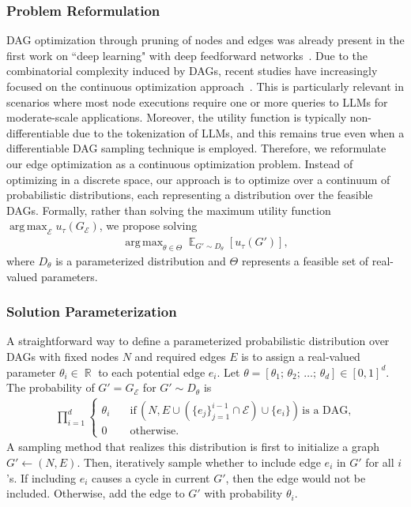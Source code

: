 \documentclass{article}
\DeclareMathOperator*{\argmax}{arg\,max}
\DeclareMathOperator{\R}{\mathbb{R}}
\DeclareMathOperator{\E}{\mathbb{E}}
\theoremstyle{plain}
\theoremstyle{definition}
\theoremstyle{remark}
\begin{document}
\subsubsection{Problem Reformulation}
DAG optimization through pruning of nodes and edges was already present in the first work on ``deep learning" with deep feedforward networks~\citep{ivakhnenko1965cybernetic, ivakhnenko1968group}.
Due to the combinatorial complexity induced by DAGs, recent studies have increasingly focused on the continuous optimization approach~\citep{vowels2022d}. 
This is particularly relevant in scenarios where most node executions require one or more queries to LLMs for moderate-scale applications. 
Moreover, the utility function is typically non-differentiable due to the tokenization of LLMs, and this remains true even when a differentiable DAG sampling technique is employed.
Therefore, we reformulate our edge optimization as a continuous optimization problem.
Instead of optimizing in a discrete space, our approach is to optimize over a continuum of probabilistic distributions, each representing a distribution over the feasible DAGs.
Formally, rather than solving the maximum utility function $\argmax_{\mathcal{E}} u_\tau(G_{\mathcal{E}})$, we propose solving
\begin{align}
    \argmax_{\theta \in \Theta} \E_{G' \sim D_\theta}[u_\tau(G')],
    \label{eq:objective}
\end{align}
where $D_\theta$ is a parameterized distribution and $\Theta$ represents a feasible set of real-valued parameters.

\subsubsection{Solution Parameterization}
A straightforward way to define a parameterized probabilistic distribution over DAGs with fixed nodes $N$ and required edges $E$ is to assign a real-valued parameter $\theta_i \in \R$ to each potential edge $e_i$. Let $\theta = [\theta_1;\, \theta_2;\, \dots;\, \theta_d] \in [0, 1]^d$. The probability of $G' = G_{\mathcal{E}}$ for $G' \sim D_\theta$ is 
\begin{align*}
    \prod_{i=1}^d\begin{cases}
    \theta_i \quad &\text{if}\,
    (N, E\cup(\{e_j\}_{j=1}^{i-1} \cap \mathcal{E}) \cup \{e_i\}) \,\text{is a DAG,}\\
    0 &\text{otherwise.}
    \end{cases}
\end{align*}
A sampling method that realizes this distribution is first to initialize a graph $G' \leftarrow (N, E)$. Then, iteratively sample whether to include edge $e_i$ in $G'$ for all $i$'s. If including $e_i$ causes a cycle in current $G'$, then the edge would not be included. Otherwise, add the edge to $G'$ with probability $\theta_i$.
\end{document}
